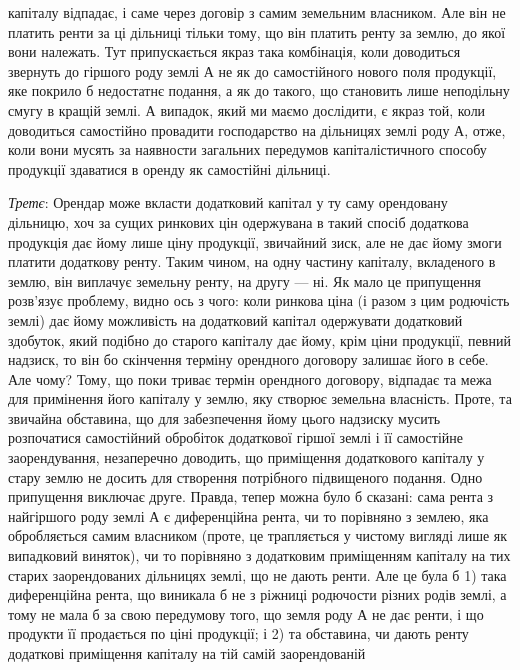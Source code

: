 \parcont{}  %
капіталу відпадає, і саме через договір з самим земельним власником. Але він не платить
ренти за ці дільниці тільки тому, що він платить ренту за землю, до
якої вони належать. Тут припускається якраз така комбінація, коли доводиться
звернуть до гіршого роду землі А не як до самостійного нового поля продукції,
яке покрило б недостатнє подання, а як до такого, що становить лише
неподільну смугу в кращій землі. А випадок, який ми маємо дослідити, є якраз той,
коли доводиться самостійно провадити господарство на дільницях землі роду А,
отже, коли вони мусять за наявности загальних передумов капіталістичного способу
продукції здаватися в оренду як самостійні дільниці.

\emph{Третє}: Орендар може вкласти додатковий капітал у ту саму орендовану
дільницю, хоч за сущих ринкових цін одержувана в такий спосіб додаткова
продукція дає йому лише ціну продукції, звичайний зиск, але не дає йому
змоги платити додаткову ренту. Таким чином, на одну частину капіталу, вкладеного
в землю, він виплачує земельну ренту, на другу — ні. Як мало це припущення
розв’язує проблему, видно ось з чого: коли ринкова ціна (і разом
з цим родючість землі) дає йому можливість на додатковий капітал одержувати
додатковий здобуток, який подібно до старого капіталу дає йому, крім ціни продукції,
певний надзиск, то він бо скінчення терміну орендного договору залишає
його в себе. Але чому? Тому, що поки триває термін орендного договору, відпадає
та межа для примінення його капіталу у землю, яку створює земельна
власність. Проте, та звичайна обставина, що для забезпечення йому цього надзиску
мусить розпочатися самостійний обробіток додаткової гіршої землі і її самостійне
заорендування, незаперечно доводить, що приміщення додаткового капіталу
у стару землю не досить для створення потрібного підвищеного подання.
Одно припущення виключає друге. Правда, тепер можна було б сказані: сама
рента з найгіршого роду землі А є диференційна рента, чи то порівняно з землею,
яка обробляється самим власником (проте, це трапляється у чистому вигляді
лише як випадковий виняток), чи то порівняно з додатковим приміщенням
капіталу на тих старих заорендованих дільницях землі, що не дають ренти.
Але це була б 1) така диференційна рента, що виникала б не з ріжниці родючости
різних родів землі, а тому не мала б за свою передумову того, що земля
роду А не дає ренти, і що продукти її продається по ціні продукції; і 2) та обставина,
чи дають ренту додаткові приміщення капіталу на тій самій заорендованій
